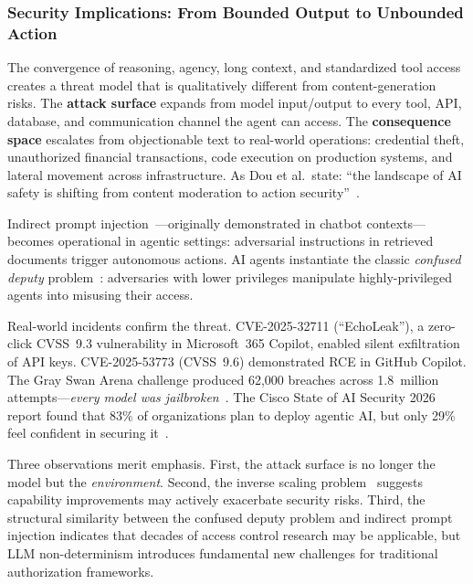 \subsubsection{Security Implications: From Bounded Output to Unbounded Action}
\label{sec:cap-implications}

The convergence of reasoning, agency, long context, and standardized tool access creates a threat model that is qualitatively different from content-generation risks. The \textbf{attack surface} expands from model input/output to every tool, API, database, and communication channel the agent can access. The \textbf{consequence space} escalates from objectionable text to real-world operations: credential theft, unauthorized financial transactions, code execution on production systems, and lateral movement across infrastructure. As Dou et al.\ state: ``the landscape of AI safety is shifting from content moderation to action security''~\cite{dou2026ajar}.

Indirect prompt injection~\cite{greshake2023ipi}---originally demonstrated in chatbot contexts---becomes operational in agentic settings: adversarial instructions in retrieved documents trigger autonomous actions. AI agents instantiate the classic \emph{confused deputy} problem~\cite{hardy1988confused}: adversaries with lower privileges manipulate highly-privileged agents into misusing their access.

Real-world incidents confirm the threat. CVE-2025-32711 (``EchoLeak''), a zero-click CVSS~9.3 vulnerability in Microsoft~365 Copilot, enabled silent exfiltration of API keys. CVE-2025-53773 (CVSS~9.6) demonstrated RCE in GitHub Copilot. The Gray Swan Arena challenge produced 62,000 breaches across 1.8~million attempts---\emph{every model was jailbroken}~\cite{grayswan2025arena}. The Cisco State of AI Security 2026 report found that 83\% of organizations plan to deploy agentic AI, but only 29\% feel confident in securing it~\cite{cisco2026aisecurity}.

Three observations merit emphasis. First, the attack surface is no longer the model but the \emph{environment}. Second, the inverse scaling problem~\cite{wang2025mcptox} suggests capability improvements may actively exacerbate security risks. Third, the structural similarity between the confused deputy problem and indirect prompt injection indicates that decades of access control research may be applicable, but LLM non-determinism introduces fundamental new challenges for traditional authorization frameworks.

